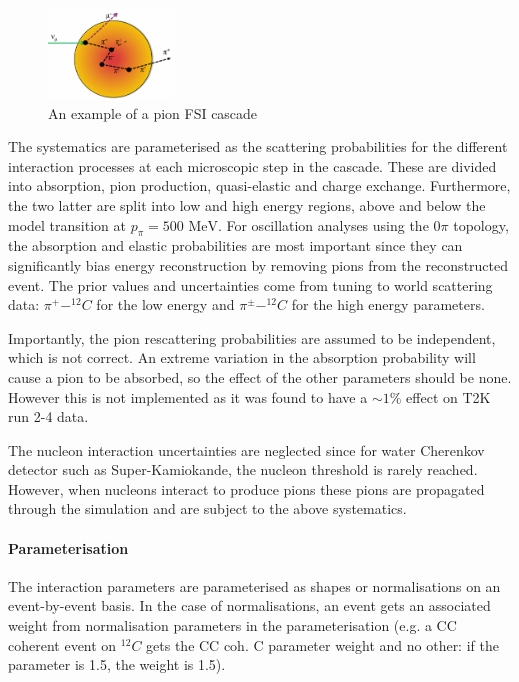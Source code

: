 \begin{figure}[h]
	\centering
	\includegraphics[width=0.3\textwidth, trim={0mm 0mm 0mm 0mm}, clip,page=1]{figures/niwg/diagrams/cascade}
	\caption{An example of a pion FSI cascade}
\end{figure}

The systematics are parameterised as the scattering probabilities for the different interaction processes at each microscopic step in the cascade. These are divided into absorption, pion production, quasi-elastic and charge exchange. Furthermore, the two latter are split into low and high energy regions, above and below the model transition at $p_\pi = 500\text{ MeV}$. For oscillation analyses using the 0$\pi$ topology, the absorption and elastic probabilities are most important since they can significantly bias energy reconstruction by removing pions from the reconstructed event. The prior values and uncertainties come from tuning to world scattering data: $\pi^+-^{12}C$ for the low energy and $\pi^\pm - ^{12}C$ for the high energy parameters.

Importantly, the pion rescattering probabilities are assumed to be independent, which is not correct. An extreme variation in the absorption probability will cause a pion to be absorbed, so the effect of the other parameters should be none. However this is not implemented as it was found to have a $\sim1\%$ effect on T2K run 2-4 data.

The nucleon interaction uncertainties are neglected since for water Cherenkov detector such as Super-Kamiokande, the nucleon threshold is rarely reached. However, when nucleons interact to produce pions these pions are propagated through the simulation and are subject to the above systematics.

\paragraph{Parameterisation}
The interaction parameters are parameterised as shapes or normalisations on an event-by-event basis. In the case of normalisations, an event gets an associated weight from normalisation parameters in the parameterisation (e.g. a CC coherent event on $^{12}C$ gets the CC coh. C parameter weight and no other: if the parameter is 1.5, the weight is 1.5). 

